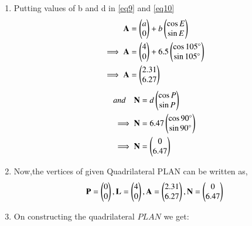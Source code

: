 \documentclass[journal,12pt,twocolumn]{IEEEtran}
\begin{document}
\begin{enumerate}
\begin{proof}
\begin{align}
Let \quad S=b\times\frac{\cos A}{\cos N} \label{eq14}
\end{align}
On computing,
\begin{align}
A^\intercal A&=a^2+b^2+2ab\cos E
\\
A^\intercal L&=a^2+ab\cos E
\\
N^\intercal A&=b d\sin P \sin E
\\
N^\intercal L&=0
\\
A^\intercal N&=b d\sin P \sin E
\\
N^\intercal N&=d^2
\end{align}
From \eqref{eq13},
\begin{align}
\implies d&=\frac{S(d^2-b d\sin P \sin E)}{b^2+ab\cos E-b d\sin P \sin E}
\end{align}
\end{proof}
By solving,we get
\begin{align}
\implies d&=\frac{-25.50(d^2-6.27d)}{42.25-6.72-6.27d}
\\
\implies d&=6.47
\end{align}
\item Putting values of b and d in \eqref{eq9} and \eqref{eq10}
\begin{align}
\mathbf{A}&=\begin{pmatrix}a\\0\end{pmatrix} +b \begin{pmatrix}\cos E\\\sin E\end{pmatrix} 
\\
\implies\mathbf{A}&=\begin{pmatrix}4\\0\end{pmatrix} +6.5 \begin{pmatrix}\cos 105\degree\\\sin 105\degree\end{pmatrix} 
\\
\implies\mathbf{A}&=\begin{pmatrix}2.31\\6.27\end{pmatrix}
\end{align}
\begin{align}
and \quad \mathbf{N}&=d \begin{pmatrix}\cos P\\\sin P\end{pmatrix}
\\
\implies\mathbf{N}&=6.47 \begin{pmatrix}\cos 90\degree\\\sin 90\degree\end{pmatrix}
\\
\implies\mathbf{N}&=\begin{pmatrix}0\\6.47\end{pmatrix}
\end{align}
\item Now,the vertices of given Quadrilateral PLAN can be written as,
\begin{align}
\mathbf{P}=\begin{pmatrix}0\\0\end{pmatrix},\mathbf{L} = \begin{pmatrix}4\\0\end{pmatrix}, \mathbf{A}=\begin{pmatrix}2.31\\6.27\end{pmatrix},\mathbf{N}=\begin{pmatrix}0\\6.47\end{pmatrix}
\end{align}
\item On constructing the quadrilateral $PLAN$ we get:
\end{enumerate}
\end{document}
